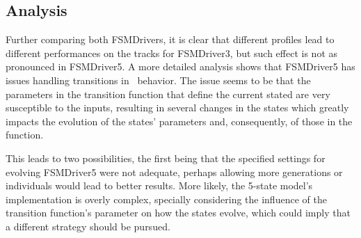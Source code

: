 

\subsection{Analysis}
Further comparing both FSMDrivers, it is clear that different profiles lead to different performances on the tracks for FSMDriver3, but such effect is not as pronounced in FSMDriver5. A more detailed analysis shows that FSMDriver5 has issues handling transitions in \racing~behavior. The issue seems to be that the parameters  in the transition function that define the current stated are very susceptible to the inputs, resulting in several changes in the states which greatly impacts the evolution of the states' parameters and, consequently, of those in the function.

This leads to two possibilities, the first being that the specified settings for evolving FSMDriver5 were not adequate, perhaps allowing more generations or individuals would lead to better results. More likely, the 5-state model's implementation is overly complex, specially considering the influence of the transition function's parameter  on how the states evolve, which could imply that a different strategy should be pursued.